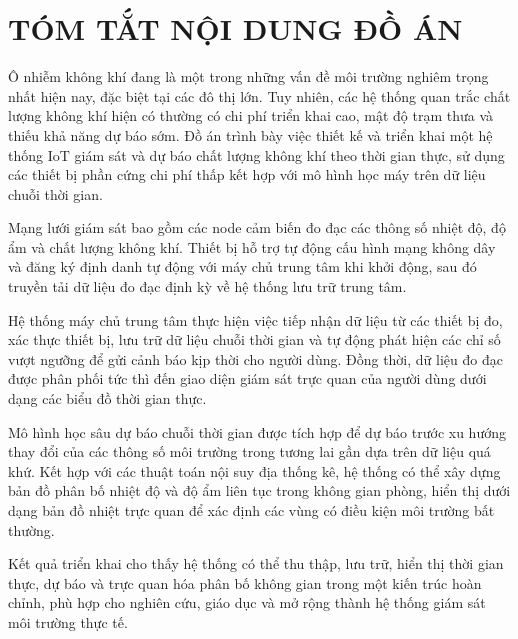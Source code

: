 \chapter*{TÓM TẮT NỘI DUNG ĐỒ ÁN}

Ô nhiễm không khí đang là một trong những vấn đề môi trường nghiêm trọng
nhất hiện nay, đặc biệt tại các đô thị lớn. Tuy nhiên, các hệ thống quan
trắc chất lượng không khí hiện có thường có chi phí triển khai cao, mật độ
trạm thưa và thiếu khả năng dự báo sớm. Đồ án trình bày việc thiết kế và triển
khai một hệ thống IoT giám sát và dự báo chất lượng không khí theo thời gian
thực, sử dụng các thiết bị phần cứng chi phí thấp kết hợp với mô hình học máy
trên dữ liệu chuỗi thời gian.

Mạng lưới giám sát bao gồm các node cảm biến đo đạc các thông số nhiệt độ, độ ẩm
và chất lượng không khí. Thiết bị hỗ trợ tự động cấu hình mạng không dây và đăng
ký định danh tự động với máy chủ trung tâm khi khởi động, sau đó truyền tải dữ
liệu đo đạc định kỳ về hệ thống lưu trữ trung tâm.

Hệ thống máy chủ trung tâm thực hiện việc tiếp nhận dữ liệu từ các thiết bị đo,
xác thực thiết bị, lưu trữ dữ liệu chuỗi thời gian và tự động phát hiện các chỉ
số vượt ngưỡng để gửi cảnh báo kịp thời cho người dùng. Đồng thời, dữ liệu đo đạc
được phân phối tức thì đến giao diện giám sát trực quan của người dùng dưới dạng
các biểu đồ thời gian thực.

Mô hình học sâu dự báo chuỗi thời gian được tích hợp để dự báo trước xu hướng thay
đổi của các thông số môi trường trong tương lai gần dựa trên dữ liệu quá khứ. Kết
hợp với các thuật toán nội suy địa thống kê, hệ thống có thể xây dựng bản đồ phân
bố nhiệt độ và độ ẩm liên tục trong không gian phòng, hiển thị dưới dạng bản đồ
nhiệt trực quan để xác định các vùng có điều kiện môi trường bất thường.

Kết quả triển khai cho thấy hệ thống có thể thu thập, lưu trữ, hiển thị thời gian
thực, dự báo và trực quan hóa phân bố không gian trong một kiến trúc hoàn chỉnh,
phù hợp cho nghiên cứu, giáo dục và mở rộng thành hệ thống giám sát môi trường
thực tế.


